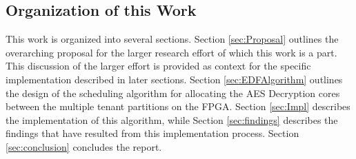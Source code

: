 \subsection{Organization of this Work} \label{sec:OrgWork}
This work is organized into several sections. Section \ref{sec:Proposal} outlines the overarching proposal for the larger research effort of which this work is a part. This discussion of the larger effort is provided as context for the specific implementation described in later sections. Section \ref{sec:EDFAlgorithm} outlines the design of the scheduling algorithm for allocating the AES Decryption cores between the multiple tenant partitions on the FPGA. Section \ref{sec:Impl} describes the implementation of this algorithm, while Section \ref{sec:findings} describes the findings that have resulted from this implementation process. Section \ref{sec:conclusion} concludes the report.